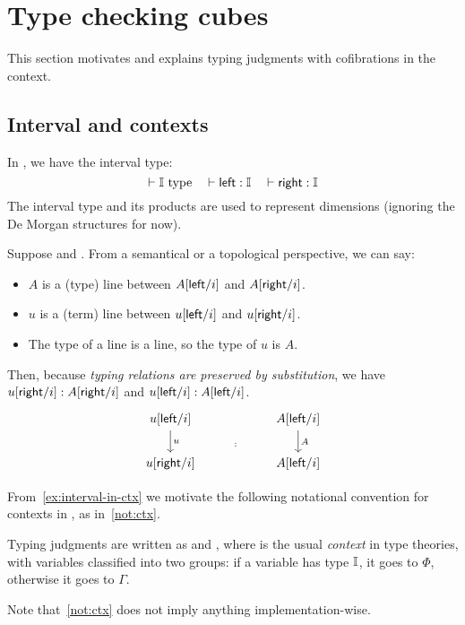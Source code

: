\section{Type checking cubes}\label{sec:tyck-cube}
This section motivates and explains typing judgments with cofibrations in the context.

\subsection{Interval and contexts}\label{sub:interval}
In \CTT, we have the interval type:
\[\vdash \mathbb{I}~\text{type}\quad \vdash \textsf{left}:\mathbb{I} \quad \vdash \textsf{right}:\mathbb{I}\]
The interval type and its products are used to represent dimensions
(ignoring the De Morgan structures for now).
\begin{example}\label{ex:interval-in-ctx}
Suppose  and .
From a semantical or a topological perspective, we can say:
\begin{itemize}
\item $A$ is a (type) line between $A[\textsf{left}/i]$ and $A[\textsf{right}/i]$.
\item $u$ is a (term) line between $u[\textsf{left}/i]$ and $u[\textsf{right}/i]$.
\item The type of a line is a line, so the type of $u$ is $A$.
\end{itemize}
Then, because \emph{typing relations are preserved by substitution},
we have $u[\textsf{right}/i]:A[\textsf{right}/i]$ and $u[\textsf{left}/i]:A[\textsf{left}/i]$.
\[\begin{tikzcd}
	{u[\lcon/i]} & {} & {A[\lcon/i]} \\
	{u[\rcon/i]} & {} & {A[\lcon/i]}
	\arrow["u", from=1-1, to=2-1]
	\arrow["A", from=1-3, to=2-3]
	\arrow["{:}"{description}, draw=none, from=1-2, to=2-2]
\end{tikzcd}\]
\end{example}
From~\cref{ex:interval-in-ctx} we motivate the following notational
convention for contexts in \CTT, as in~\cref{not:ctx}.
\begin{notation}\label{not:ctx}
Typing judgments are written as  and ,
where \fbox{$\Phi;\Gamma$} is the usual \textit{context} in type theories,
with variables classified into two groups: if a variable has type $\mathbb{I}$,
it goes to $\Phi$, otherwise it goes to $\Gamma$.
\end{notation}
Note that~\cref{not:ctx} does not imply anything implementation-wise.

